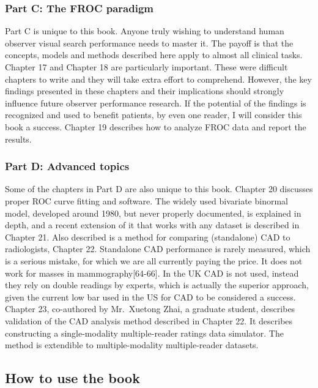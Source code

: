 \documentclass[
]{book}
\begin{document}
\hypertarget{part-c-the-froc-paradigm}{%
\subsubsection{Part C: The FROC paradigm}\label{part-c-the-froc-paradigm}}

Part C is unique to this book. Anyone truly wishing to understand human observer visual search performance needs to master it. The payoff is that the concepts, models and methods described here apply to almost all clinical tasks. Chapter 17 and Chapter 18 are particularly important. These were difficult chapters to write and they will take extra effort to comprehend. However, the key findings presented in these chapters and their implications should strongly influence future observer performance research. If the potential of the findings is recognized and used to benefit patients, by even one reader, I will consider this book a success. Chapter 19 describes how to analyze FROC data and report the results.

\hypertarget{part-d-advanced-topics}{%
\subsubsection{Part D: Advanced topics}\label{part-d-advanced-topics}}

Some of the chapters in Part D are also unique to this book. Chapter 20 discusses proper ROC curve fitting and software. The widely used bivariate binormal model, developed around 1980, but never properly documented, is explained in depth, and a recent extension of it that works with any dataset is described in Chapter 21. Also described is a method for comparing (standalone) CAD to radiologists, Chapter 22. Standalone CAD performance is rarely measured, which is a serious mistake, for which we are all currently paying the price. It does not work for masses in mammography{[}64-66{]}. In the UK CAD is not used, instead they rely on double readings by experts, which is actually the superior approach, given the current low bar used in the US for CAD to be considered a success. Chapter 23, co-authored by Mr.~Xuetong Zhai, a graduate student, describes validation of the CAD analysis method described in Chapter 22. It describes constructing a single-modality multiple-reader ratings data simulator. The method is extendible to multiple-modality multiple-reader datasets.

\hypertarget{how-to-use-the-book}{%
\subsection{How to use the book}\label{how-to-use-the-book}}
\end{document}
